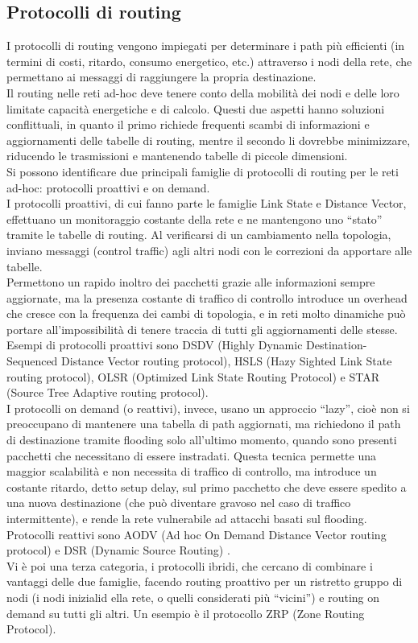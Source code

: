 \subsection[Protocolli di routing]{Protocolli di routing}
I protocolli di routing vengono impiegati per determinare i path più efficienti (in termini di costi, ritardo, consumo energetico, etc.) attraverso i nodi della rete, che permettano ai messaggi di raggiungere la propria destinazione. \\
Il routing nelle reti ad-hoc deve tenere conto della mobilità dei nodi e delle loro limitate capacità energetiche e di calcolo. 
Questi due aspetti hanno soluzioni conflittuali, in quanto il primo richiede frequenti scambi di informazioni e aggiornamenti delle tabelle di routing, mentre il secondo li dovrebbe minimizzare, riducendo le trasmissioni e mantenendo tabelle di piccole dimensioni. \\
Si possono identificare due principali famiglie di protocolli di routing per le reti ad-hoc: protocolli proattivi e on demand.\\
I protocolli proattivi, di cui fanno parte le famiglie Link State e Distance Vector, effettuano un monitoraggio costante della rete e ne mantengono uno “stato” tramite le tabelle di routing. 
Al verificarsi di un cambiamento nella topologia, inviano messaggi (control traffic) agli altri nodi con le correzioni da apportare alle tabelle.\\ Permettono un rapido inoltro dei pacchetti grazie alle informazioni sempre aggiornate, ma la presenza costante di traffico di controllo introduce un overhead che cresce con la frequenza dei cambi di topologia, e in reti molto dinamiche può portare all'impossibilità di tenere traccia di tutti gli aggiornamenti delle stesse. Esempi di protocolli proattivi sono DSDV (Highly Dynamic Destination-Sequenced Distance Vector routing protocol), HSLS (Hazy Sighted Link State routing protocol), OLSR (Optimized Link State Routing Protocol) e STAR (Source Tree Adaptive routing protocol).\\
I protocolli on demand (o reattivi), invece, usano un approccio “lazy”, cioè non si preoccupano di mantenere una tabella di path aggiornati, ma richiedono il path di destinazione tramite flooding solo all'ultimo momento, quando sono presenti pacchetti che necessitano di essere instradati.
Questa tecnica permette una maggior scalabilità e non necessita di traffico di controllo, ma introduce un costante ritardo, detto setup delay, sul primo pacchetto che deve essere spedito a una nuova destinazione (che può diventare gravoso nel caso di traffico intermittente), e rende la rete vulnerabile ad attacchi basati sul flooding. Protocolli reattivi sono AODV (Ad hoc On Demand Distance Vector routing protocol) e DSR (Dynamic Source Routing) \cite{self organizing, self healing wireless network}. \\
Vi è poi una terza categoria, i protocolli ibridi, che cercano di combinare i vantaggi delle due famiglie, facendo routing proattivo per un ristretto gruppo di nodi (i nodi inizialid ella rete, o quelli considerati più “vicini”) e routing on demand su tutti gli altri. Un esempio è il protocollo ZRP (Zone Routing Protocol).\\

